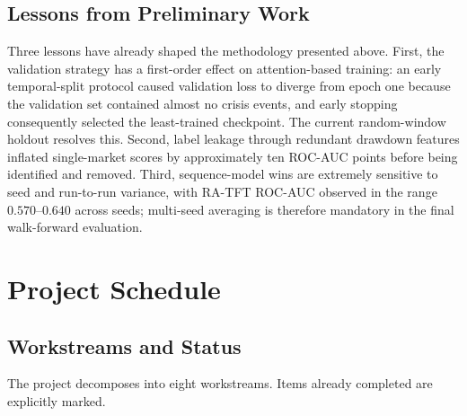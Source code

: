 \documentclass[11pt,a4paper]{article}
\begin{document}
\subsection{Lessons from Preliminary Work}
Three lessons have already shaped the methodology presented above. First,
the validation strategy has a first-order effect on attention-based
training: an early temporal-split protocol caused validation loss to
diverge from epoch one because the validation set contained almost no
crisis events, and early stopping consequently selected the least-trained
checkpoint. The current random-window holdout resolves this. Second, label
leakage through redundant drawdown features inflated single-market scores
by approximately ten ROC-AUC points before being identified and removed.
Third, sequence-model wins are extremely sensitive to seed and run-to-run
variance, with RA-TFT ROC-AUC observed in the range $0.570$--$0.640$
across seeds; multi-seed averaging is therefore mandatory in the final
walk-forward evaluation.

\section{Project Schedule}
\label{sec:schedule}

\subsection{Workstreams and Status}
The project decomposes into eight workstreams. Items already completed are
explicitly marked.
\end{document}
